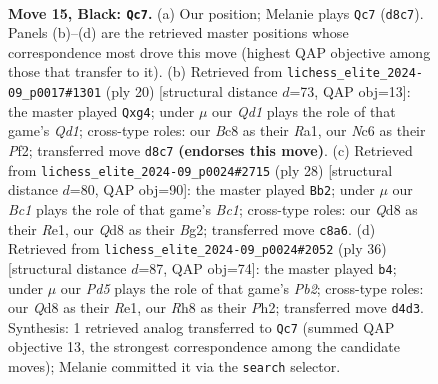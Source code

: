 \documentclass[11pt]{article}
\begin{document}
\clearpage

\begin{figure}[p]\centering
\begin{subfigure}{0.46\textwidth}\centering
\resizebox{\linewidth}{!}{%
\newchessgame
\chessboard[
  setfen={r1bqkb1r/5ppp/1pn5/p3P1N1/3p3P/1Q6/PP3PP1/RNB2RK1 b q - 1 15},
  showmover=false,
  pgfstyle=straightmove, color=movearrow, markmove={d8-c7}
]}
\caption{}
\end{subfigure}\hfill
\begin{subfigure}{0.46\textwidth}\centering
\resizebox{\linewidth}{!}{%
\newchessgame
\chessboard[
  setfen={rn2k2r/pp2b1pp/3p1n2/2pPp3/2P3q1/2NB4/PP3PPP/R1BQK2R w KQkq - 2 11},
  showmover=false,
  pgfstyle=straightmove, color=movearrow, markmove={d1-g4}
]}
\caption{}
\end{subfigure}
\\[4pt]
\begin{subfigure}{0.46\textwidth}\centering
\resizebox{\linewidth}{!}{%
\newchessgame
\chessboard[
  setfen={r1bq1rk1/pp4pp/2p5/4pp2/P1P1n3/6P1/2Q2PBP/R1B1R1K1 w - - 0 15},
  showmover=false,
  pgfstyle=straightmove, color=movearrow, markmove={c1-b2}
]}
\caption{}
\end{subfigure}\hfill
\begin{subfigure}{0.46\textwidth}\centering
\resizebox{\linewidth}{!}{%
\newchessgame
\chessboard[
  setfen={2r2rk1/p3q1pp/p1p5/2PpPp1b/3Nn3/P7/1PQ2PPP/R1B1R1K1 w - - 3 19},
  showmover=false,
  pgfstyle=straightmove, color=movearrow, markmove={b2-b4}
]}
\caption{}
\end{subfigure}
\caption{\textbf{Move 15, Black: \texttt{Qc7}.} (a) Our position; Melanie plays \texttt{Qc7} (\texttt{d8c7}). Panels (b)--(d) are the retrieved master positions whose correspondence most drove this move (highest QAP objective among those that transfer to it). (b) Retrieved from \texttt{lichess\_elite\_2024-09\_p0017\#1301} (ply 20) [structural distance $d$=73, QAP obj=13]: the master played \texttt{Qxg4}; under $\mu$ our \emph{Qd1} plays the role of that game's \emph{Qd1}; cross-type roles: our \emph{B}c8 as their \emph{R}a1, our \emph{N}c6 as their \emph{P}f2; transferred move \texttt{d8c7} \textbf{(endorses this move)}. (c) Retrieved from \texttt{lichess\_elite\_2024-09\_p0024\#2715} (ply 28) [structural distance $d$=80, QAP obj=90]: the master played \texttt{Bb2}; under $\mu$ our \emph{Bc1} plays the role of that game's \emph{Bc1}; cross-type roles: our \emph{Q}d8 as their \emph{R}e1, our \emph{Q}d8 as their \emph{B}g2; transferred move \texttt{c8a6}. (d) Retrieved from \texttt{lichess\_elite\_2024-09\_p0024\#2052} (ply 36) [structural distance $d$=87, QAP obj=74]: the master played \texttt{b4}; under $\mu$ our \emph{Pd5} plays the role of that game's \emph{Pb2}; cross-type roles: our \emph{Q}d8 as their \emph{R}e1, our \emph{R}h8 as their \emph{P}h2; transferred move \texttt{d4d3}. Synthesis: 1 retrieved analog transferred to \texttt{Qc7} (summed QAP objective 13, the strongest correspondence among the candidate moves); Melanie committed it via the \texttt{search} selector.}
\label{fig:thought-m29}
\end{figure}
\end{document}
